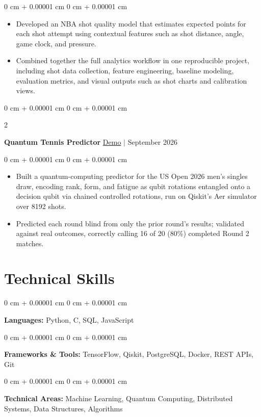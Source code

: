 \documentclass[10pt, letterpaper]{article}
\newenvironment{highlights}{
    \begin{itemize}[
        topsep=0.06 cm,
        parsep=0.06 cm,
        partopsep=0pt,
        itemsep=0pt,
        leftmargin=0 cm + 10pt
    ]
}{
    \end{itemize}
}
\newenvironment{onecolentry}{
    \begin{adjustwidth}{
        0 cm + 0.00001 cm
    }{
        0 cm + 0.00001 cm
    }
}{
    \end{adjustwidth}
}
\newenvironment{twocolentry}[2][]{
    \onecolentry
    \def\secondColumn{#2}
    \setcolumnwidth{\fill, 4.5 cm}
    \begin{paracol}{2}
}{
    \switchcolumn \raggedleft \secondColumn
    \end{paracol}
    \endonecolentry
}
\begin{document}
\vspace{0.06 cm}
\begin{onecolentry}
    \begin{highlights}
        \item Developed an NBA shot quality model that estimates expected points for each shot attempt using contextual features such as shot distance, angle, game clock, and pressure.
        \item Combined together the full analytics workflow in one reproducible project, including shot data collection, feature engineering, baseline modeling, evaluation metrics, and visual outputs such as shot charts and calibration views.
    \end{highlights}
\end{onecolentry}

\begin{twocolentry}{
    \href{https://amin9666.github.io/Mens_Open_Quantum_26/}{Demo} $|$ September 2026
}
    \textbf{Quantum Tennis Predictor}\end{twocolentry}

\vspace{0.06 cm}
\begin{onecolentry}
    \begin{highlights}
        \item Built a quantum-computing predictor for the US Open 2026 men's singles draw, encoding rank, form, and fatigue as qubit rotations entangled onto a decision qubit via chained controlled rotations, run on Qiskit's Aer simulator over 8192 shots.
        \item Predicted each round blind from only the prior round's results; validated against real outcomes, correctly calling 16 of 20 (80\%) completed Round 2 matches.
    \end{highlights}
\end{onecolentry}

\section{Technical Skills}

\begin{onecolentry}
    \textbf{Languages:} Python, C, SQL, JavaScript
\end{onecolentry}

\vspace{0.14 cm}

\begin{onecolentry}
    \textbf{Frameworks \& Tools:} TensorFlow, Qiskit, PostgreSQL, Docker, REST APIs, Git
\end{onecolentry}

\vspace{0.14 cm}

\begin{onecolentry}
    \textbf{Technical Areas:} Machine Learning, Quantum Computing, Distributed Systems, Data Structures, Algorithms
\end{onecolentry}
\end{document}
